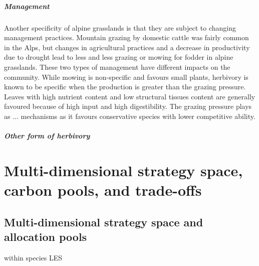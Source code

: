 \paragraph{Management}
Another specificity of alpine grasslands is that they are subject to changing management practices. Mountain grazing by domestic cattle was fairly common in the Alps, but changes in agricultural practices and a decrease in productivity due to drought lead to less and less grazing or mowing for fodder in alpine grasslands. These two types of management have different impacts on the community. While mowing is non-specific and favours small plants, herbivory is known to be specific when the production is greater than the grazing pressure. Leaves with high nutrient content and low structural tissues content are generally favoured because of high input and high digestibility. The grazing pressure plays as ... mechanisms as it favours conservative species with lower competitive ability.

\paragraph{Other form of herbivory}



\chapter{Multi-dimensional strategy space, carbon pools, and trade-offs}
\section{Multi-dimensional strategy space and allocation pools}
%
within species LES %

